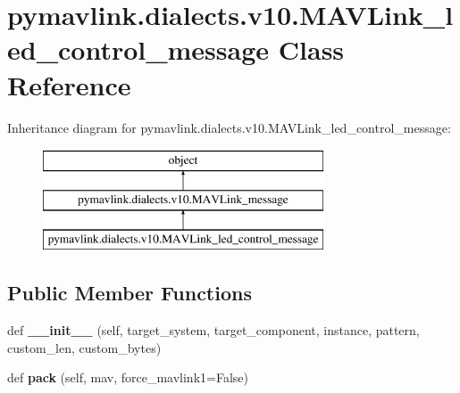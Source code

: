 \hypertarget{classpymavlink_1_1dialects_1_1v10_1_1MAVLink__led__control__message}{}\section{pymavlink.\+dialects.\+v10.\+M\+A\+V\+Link\+\_\+led\+\_\+control\+\_\+message Class Reference}
\label{classpymavlink_1_1dialects_1_1v10_1_1MAVLink__led__control__message}
Inheritance diagram for pymavlink.\+dialects.\+v10.\+M\+A\+V\+Link\+\_\+led\+\_\+control\+\_\+message\+:\begin{figure}[H]
\begin{center}
\leavevmode
\includegraphics[height=3.000000cm]{classpymavlink_1_1dialects_1_1v10_1_1MAVLink__led__control__message}
\end{center}
\end{figure}
\subsection*{Public Member Functions}
\begin{DoxyCompactItemize}
\item 
\mbox{\label{classpymavlink_1_1dialects_1_1v10_1_1MAVLink__led__control__message_a0221d5579e2be51296290a41a36a61d4}} 
def {\bfseries \+\_\+\+\_\+init\+\_\+\+\_\+} (self, target\+\_\+system, target\+\_\+component, instance, pattern, custom\+\_\+len, custom\+\_\+bytes)
\item 
\mbox{\label{classpymavlink_1_1dialects_1_1v10_1_1MAVLink__led__control__message_acdd116f8503a97d1dbe2ce794b02b82b}} 
def {\bfseries pack} (self, mav, force\+\_\+mavlink1=False)
\end{DoxyCompactItemize}
